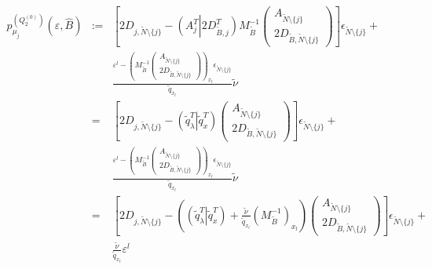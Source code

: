 \documentclass[a4paper]{article}
\newcommand{\pmu}[2]{\ensuremath{p_{\mu_{j}}^{(#1)}(\varepsilon, #2)}}
\begin{document}
\begin{eqnarray}
\pmu{Q_{2}^{(0)}}{\hat{B}} &:=& 
  \left[
      2D_{j, \tilde{N} \setminus \{j\}} 
        -\left(A_{j}^{T} \left| \right. 2D_{\tilde{B}, j}^{T}
        \right)
      M_{\tilde{B}}^{-1}
      \left(\begin{array}{c}
              A_{\tilde{N} \setminus \{j\}} \\
	      \hline
	      2D_{\tilde{B}, \tilde{N} \setminus \{j\}}
	    \end{array}
      \right)
   \right]\epsilon_{\tilde{N} \setminus \{j\}} +
\nonumber \\ 
  &&
  \frac{\varepsilon^{l} -
         \left(M_{\tilde{B}}^{-1}
           \left(\begin{array}{c}
                    A_{\tilde{N} \setminus \{j\}}  \\
	            \hline
	            2D_{\tilde{B}, \tilde{N} \setminus \{j\}}
	         \end{array}
	   \right)
         \right)_{x_{l}}\epsilon_{\tilde{N} \setminus \{j\}}}
        {\tilde{q}_{x_{l}}}\tilde{\nu}
\nonumber \\
&=&
  \left[
      2D_{j, \tilde{N} \setminus \{j\}}
      - \left(\tilde{q}_{\lambda}^{T} \left| \right. \tilde{q}_{x}^{T}\right)
      \left(\begin{array}{c}
              A_{\tilde{N} \setminus \{j\}} \\
	      \hline
	      2D_{\tilde{B}, \tilde{N} \setminus \{j\}}
	    \end{array}
      \right)
   \right]\epsilon_{\tilde{N} \setminus \{j\}} +
\nonumber \\ 
  &&
  \frac{\varepsilon^{l} -
         \left(M_{\tilde{B}}^{-1}
           \left(\begin{array}{c}
                    A_{\tilde{N} \setminus \{j\}}  \\
	            \hline
	            2D_{\tilde{B}, \tilde{N} \setminus \{j\}}
	         \end{array}
	   \right)
         \right)_{x_{l}}\epsilon_{\tilde{N} \setminus \{j\}}}
	{\tilde{q}_{x_{l}}}\tilde{\nu}
\nonumber \\
&=&
  \left[
      2D_{j, \tilde{N} \setminus \{j\}}
      -\left(
         \left(\tilde{q}_{\lambda}^{T} \left| \right. \tilde{q}_{x}^{T}\right)
         + \frac{\tilde{\nu}}{\tilde{q}_{x_{l}}}
	 \left(M_{\tilde{B}}^{-1}\right)_{x_{l}}
       \right)
      \left(\begin{array}{c}
              A_{\tilde{N} \setminus \{j\}} \\
	      \hline
	      2D_{\tilde{B}, \tilde{N} \setminus \{j\}}
	    \end{array}
      \right)
   \right]\epsilon_{\tilde{N} \setminus \{j\}} +
\nonumber \\
  &&
\frac{\tilde{\nu}}{\tilde{q}_{x_{l}}}\varepsilon^{l}
\end{eqnarray}
\end{document}
